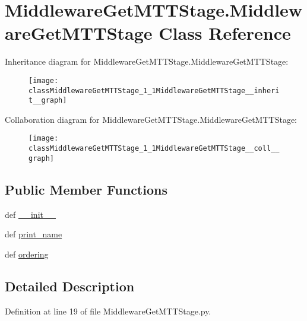 \hypertarget{classMiddlewareGetMTTStage_1_1MiddlewareGetMTTStage}{\section{Middleware\-Get\-M\-T\-T\-Stage.\-Middleware\-Get\-M\-T\-T\-Stage Class Reference}
\label{classMiddlewareGetMTTStage_1_1MiddlewareGetMTTStage}
}


Inheritance diagram for Middleware\-Get\-M\-T\-T\-Stage.\-Middleware\-Get\-M\-T\-T\-Stage\-:\nopagebreak
\begin{figure}[H]
\begin{center}
\leavevmode
\texttt{[image: classMiddlewareGetMTTStage\_1\_1MiddlewareGetMTTStage\_\_inherit\_\_graph]}
\end{center}
\end{figure}


Collaboration diagram for Middleware\-Get\-M\-T\-T\-Stage.\-Middleware\-Get\-M\-T\-T\-Stage\-:\nopagebreak
\begin{figure}[H]
\begin{center}
\leavevmode
\texttt{[image: classMiddlewareGetMTTStage\_1\_1MiddlewareGetMTTStage\_\_coll\_\_graph]}
\end{center}
\end{figure}
\subsection*{Public Member Functions}
\begin{DoxyCompactItemize}
\item 
def \hyperlink{classMiddlewareGetMTTStage_1_1MiddlewareGetMTTStage_ae2e26fd7da049c1e09153d918a51b745}{\-\_\-\-\_\-init\-\_\-\-\_\-}
\item 
def \hyperlink{classMiddlewareGetMTTStage_1_1MiddlewareGetMTTStage_a9c3c44f221e71ddc8505bb1e97e51d72}{print\-\_\-name}
\item 
def \hyperlink{classMiddlewareGetMTTStage_1_1MiddlewareGetMTTStage_aba76659ed81077069af2f333515ef7ba}{ordering}
\end{DoxyCompactItemize}


\subsection{Detailed Description}


Definition at line 19 of file Middleware\-Get\-M\-T\-T\-Stage.\-py.



